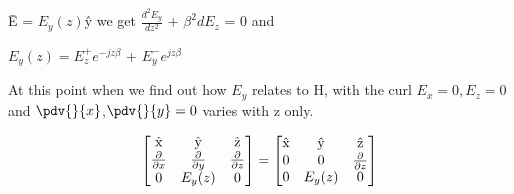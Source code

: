 \={E} = $E_y(z)$\^{y} we get $\frac{d^2E_y}{dz^2}$ + $\beta^2dE_z$ = 0 and  

$E_y(z) = E_z^+e^{-jz\beta}$ + $E_y^-e^{jz\beta}$

At this point when we find out how $E_y$ relates to H, with the curl $E_x = 0, E_z = 0$ and $\pdv{}{x}$,$\pdv{}{y} = 0$ varies with z only.

\[
\begin{bmatrix}
$\^{x}$ & $\^{y}$ & $\^{z}$\\
\frac{\partial}{\partial x} & \frac{\partial}{\partial y} & \frac{\partial}{\partial z}\\
0 & E_y(z) & 0
\end{bmatrix} =
\begin{bmatrix}
$\^{x}$ & $\^{y}$ & $\^{z}$\\
0 & 0 & \frac{\partial}{\partial z}\\
0 & E_y(z) & 0
\end{bmatrix}
\]

